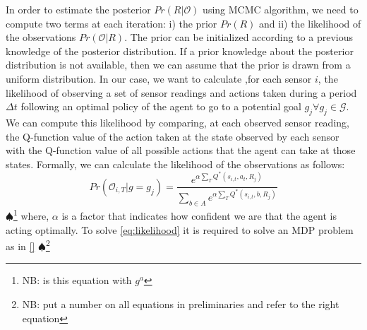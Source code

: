 \documentclass[letterpaper, 10 pt, conference]{ieeeconf}  %
\newcommand\NB[1]{$\spadesuit$\footnote{NB: #1}}
\begin{document}
In order to estimate the posterior $Pr(R|\mathcal{O})$ using MCMC algorithm, we need to compute two terms at each iteration: i) the prior $Pr(R)$ and ii) the likelihood of the observations $Pr(\mathcal{O}|R)$.
The prior can be initialized according to a previous knowledge of the posterior distribution. If a prior knowledge about the posterior distribution is not available, then we can assume that the prior is drawn from a uniform distribution.
In our case, we want to calculate ,for each sensor $i$, the likelihood of observing a set of sensor readings and actions taken during a period $\Delta t$ following an optimal policy of the agent to go to a potential goal $g_j \forall g_j \in \mathcal G$. We can compute this likelihood by comparing, at each observed sensor reading, the Q-function value of the action taken at the state observed by each sensor with the Q-function value of all possible actions that the agent can take at those states. Formally, we can calculate the likelihood of the observations as follows:
\begin{equation}
Pr(\mathcal{O}_{i,T} | g = g_j)  = \frac{e^{\alpha\sum_{T}{Q^*(s_{i,t},a_t,R_j)}}}{\sum_{b\in A}{}e^{\alpha\sum_{T}{}Q^*(s_{i,t},b,R_j)}}
\label{eq:likelihood}
\end{equation}
\NB{is this equation with $g^a$}
where, $\alpha$ is a factor that indicates how confident we are that the agent is acting optimally. To solve \eqref{eq:likelihood} it is required to solve an MDP problem as in \eqref{} \NB{put a number on all equations in preliminaries and refer to the right equation}




%


\end{document}
